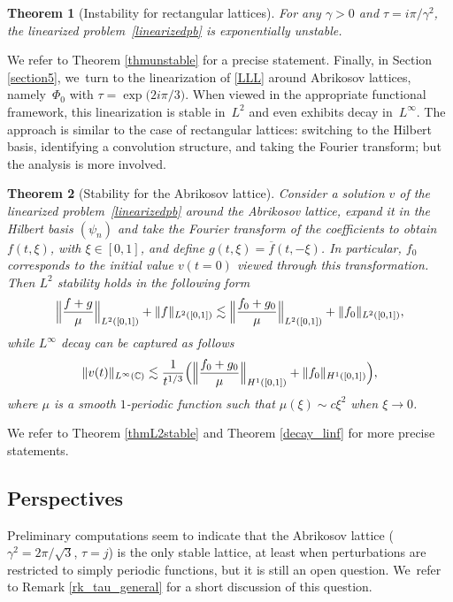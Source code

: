 \documentclass[JEP,XML,SOM,Unicode,NoFloatCountersInSection,published]{cedram}
\newtheorem{theorem}{Theorem}[section]
\theoremstyle{definition}
\let\EE\exp
\let\ov\overline
\newcommand\C{\mathbb C}
\begin{document}
\begin{theorem}[Instability for rectangular lattices]
For any $\gamma>0$ and $\tau = {i \pi}/{\gamma^2}$, the linearized problem~\eqref{linearizedpb} is exponentially unstable.
\end{theorem}

We refer to Theorem \ref{thmunstable} for a precise statement.
Finally, in Section \ref{section5}, we~turn to the linearization of \eqref{LLL} around Abrikosov lattices, namely~$\Phi_0$ with $\tau = \EE\bigl({{2i\pi}/{3}}\bigr)$. When viewed in the appropriate functional framework, this linearization is stable in~$L^2$ and even exhibits decay in~$L^\infty$. The approach is similar to the case of rectangular lattices: switching to the Hilbert basis, identifying a convolution structure, and taking the Fourier transform; but the analysis is more involved.

\begin{theorem}[Stability for the Abrikosov lattice]
Consider a solution $v$ of the linearized problem~\eqref{linearizedpb} around the Abrikosov lattice, expand it in the Hilbert basis $(\psi_n)$ and take the Fourier transform of the coefficients to obtain $f(t,\xi)$, with $\xi \in [0,1]$, and define $g(t,\xi)=\ov{f}(t,-\xi)$. In particular, $f_0$ corresponds to the initial value $v(t=0)$ viewed through this transformation.
Then $L^2$ stability holds in the following form
\[
\Bigl\| \frac{f+g}{\mu} \Bigr\|_{L^2([0,1])} + \| f \|_{L^2([0,1])} \lesssim \Bigl\| \frac{f_0+g_0}{\mu} \Bigr\|_{L^2([0,1])} + \| f_0 \|_{L^2([0,1])},
\]
while $L^\infty$ decay can be captured as follows
\[
\| v(t) \|_{L^\infty(\C)} \lesssim \frac{1}{t^{1/3}} \Bigl(\Bigl\| \frac{f_0+g_0}{\mu} \Bigr\|_{H^1([0,1])} + \| f_0 \|_{H^1([0,1])} \Bigr),
\]
where $\mu$ is a smooth $1$-periodic function such that $\mu(\xi) \sim c \xi^2$ when $\xi \to 0$.
\end{theorem}

We refer to Theorem \ref{thmL2stable} and Theorem \ref{decay_linf} for more precise statements.

\subsection{Perspectives}

Preliminary computations seem to indicate that the Abrikosov lattice ($\gamma^2 = {2\pi}/{\sqrt 3}$, $\tau =j$) is the only stable lattice, at least when perturbations are restricted to simply periodic functions, but it is still an open question. We~refer to Remark \ref{rk_tau_general} for a short discussion of this question.
\end{document}
